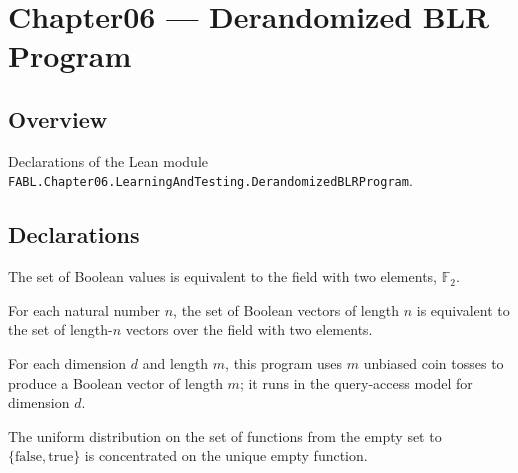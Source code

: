 \chapter{Chapter06 — Derandomized BLR Program}
\section{Overview}

Declarations of the Lean module \texttt{FABL.Chapter06.LearningAndTesting.DerandomizedBLRProgram}.

\section{Declarations}

\begin{definition}
\leanok
{}
The set of Boolean values is equivalent to the field with two elements,
$\mathbb{F}_2$.
\end{definition}

\begin{definition}
\leanok
{}
For each natural number $n$, the set of Boolean vectors of length $n$ is equivalent to
the set of length-$n$ vectors over the field with two elements.
\end{definition}

\begin{definition}
\label{FABL.randomBitVectorProgram}
\leanok
{}
For each dimension $d$ and length $m$, this program uses $m$ unbiased coin tosses to
produce a Boolean vector of length $m$; it runs in the query-access model for dimension
$d$.
\end{definition}

\begin{theorem}
\label{FABL.uniformPMF_finZeroArrowBool}
\leanok
{}
The uniform distribution on the set of functions from the empty set to
$\{\mathrm{false},\mathrm{true}\}$ is concentrated on the unique empty function.
\end{theorem}

